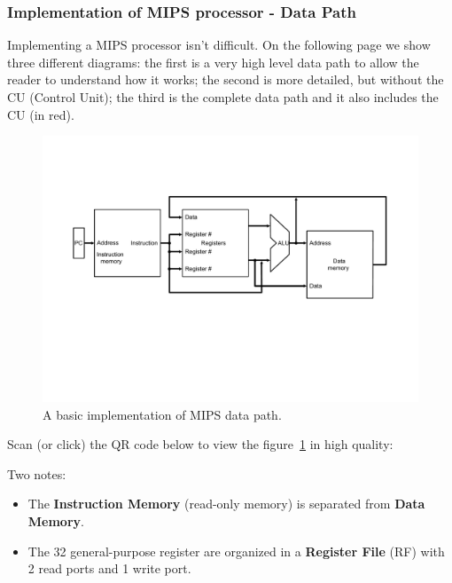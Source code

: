 \subsubsection{Implementation of MIPS processor - Data Path}

Implementing a MIPS processor isn't difficult. On the following page we show three different diagrams: the first is a very high level data path to allow the reader to understand how it works; the second is more detailed, but without the CU (Control Unit); the third is the complete data path and it also includes the CU (in red).

\begin{figure}[!htp]
    \centering
    \includegraphics[width=\textwidth]{img/basic-implementation-mips-datapath.pdf}
    \caption{A basic implementation of MIPS data path.\cite{pipelining-slides}}
    \label{fig: basic implementation of MIPS data path}
\end{figure}

\noindent
Scan (or click) the QR code below to view the figure~\ref{fig: basic implementation of MIPS data path} in high quality:
\begin{center}
\end{center}
Two notes:
\begin{itemize}
    \item The \textbf{Instruction Memory} (read-only memory) is separated from \textbf{Data Memory}.
    
    \item The 32 general-purpose register are organized in a \textbf{Register File} (RF) with 2 read ports and 1 write port.
\end{itemize}

